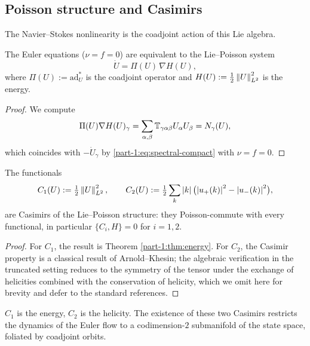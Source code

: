 \subsection{Poisson structure and Casimirs}
\label{part-1:ssec:LiePoisson}

The Navier--Stokes nonlinearity is the coadjoint action of this Lie 
algebra.

\begin{proposition}\label{part-1:prop:LiePoisson}
The Euler equations ($\nu = f = 0$) are equivalent to the Lie--Poisson 
system
\begin{equation}\label{part-1:eq:LiePoisson}
\dot U = \Pi(U)\, \nabla H(U),
\end{equation}
where $\Pi(U) := \mathrm{ad}^\ast_U$ is the coadjoint operator and 
$H(U) := \tfrac12\left\lVert U \right\rVert_{L^2}^2$ is the energy.
\end{proposition}

\begin{proof}
We compute
\begin{equation*}
\Pi(U)\nabla H(U)_\gamma = \sum_{\alpha,\beta} \mathbb{T}_{\gamma\alpha\beta} 
U_\alpha U_\beta = N_\gamma(U),
\end{equation*}
which coincides with $-\dot U_\gamma$ by \eqref{part-1:eq:spectral-compact} 
with $\nu = f = 0$.
\end{proof}

\begin{proposition}[Casimirs]\label{part-1:prop:Casimirs}
The functionals
\begin{equation}\label{part-1:eq:Casimirs}
C_1(U) := \tfrac12\left\lVert U \right\rVert_{L^2}^2,
\qquad
C_2(U) := \tfrac12\sum_{k} \left\lvert k \right\rvert\bigl(\left\lvert u_+(k) \right\rvert^2 - \left\lvert u_-(k) \right\rvert^2\bigr),
\end{equation}
are Casimirs of the Lie--Poisson structure: they Poisson-commute with 
every functional, in particular $\{C_i, H\} = 0$ for $i = 1, 2$.
\end{proposition}

\begin{proof}
For $C_1$, the result is Theorem \ref{part-1:thm:energy}. For $C_2$, the 
Casimir property is a classical result of Arnold--Khesin; the 
algebraic verification in the truncated setting reduces to the 
symmetry of the tensor under the exchange of helicities combined with 
the conservation of helicity, which we omit here for brevity and 
defer to the standard references.
\end{proof}

\begin{remark}\label{part-1:rem:Casimirs-meaning}
$C_1$ is the energy, $C_2$ is the helicity. The existence of these two 
Casimirs restricts the dynamics of the Euler flow to a codimension-$2$ 
submanifold of the state space, foliated by coadjoint orbits.
\end{remark}

